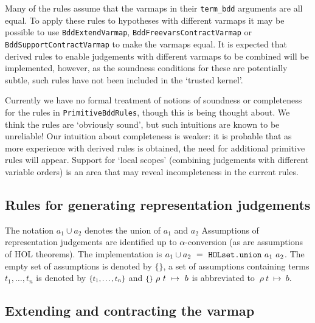 \documentclass[12pt,fleqn]{article}
\renewcommand{\t}[1]{\mbox{\tt #1}}
\newcommand{\termbdd}[4]{\mbox{$#1~#2~#3~\mapsto~#4$}}
\newcommand{\emptyass}{\mbox{\footnotesize$\{{}\}$}{}}
\newcommand{\setass}[1]{\mbox{\footnotesize$\{#1\}$}{}}
\newcommand\termbddty{\texttt{term\_bdd}{}}
\begin{document}
Many of the rules assume that the varmaps in their \termbddty
arguments are all equal. To apply these rules to hypotheses with
different varmaps it may be possible to use \t{BddExtendVarmap},
\t{BddFreevarsContractVarmap} or \t{BddSupportContractVarmap} to make
the varmaps equal.  It is expected that derived rules to enable
judgements with different varmaps to be combined will be implemented,
however, as the soundness conditions for these are potentially subtle,
such rules have not been included in the `trusted kernel'.

Currently we have no formal treatment of notions of soundness or
completeness for the rules in \t{PrimitiveBddRules}, though this is
being thought about. We think the rules are `obviously sound', but
such intuitions are known to be unreliable! Our intuition about
completeness is weaker: it is probable that as more experience with
derived rules is obtained, the need for additional primitive rules
will appear. Support for `local scopes' (combining judgements with
different variable orders) is an area that may reveal incompleteness
in the current rules.

\subsection{Rules for generating representation judgements}\label{term-bdd-rules}

The notation $a_1 \cup a_2$ denotes the union of $a_1$ and $a_2$ 
Assumptions of
representation judgements are identified up to $\alpha$-conversion (as
are assumptions of HOL theorems).
The implementation is $a_1 \cup a_2~=~\t{HOLset.union}~a_1~a_2$. 
The empty set of assumptions is denoted by \emptyass, a set of
assumptions containing terms $t_1, \ldots ,t_n$ is denoted by
$\setass{t_1, \ldots ,t_n}$  and 
$\termbdd{\emptyass}{\rho}{t}{b}$ is abbreviated to
$\termbdd{}{\rho}{t}{b}$.


\subsection{Extending and contracting the varmap}
\end{document}
